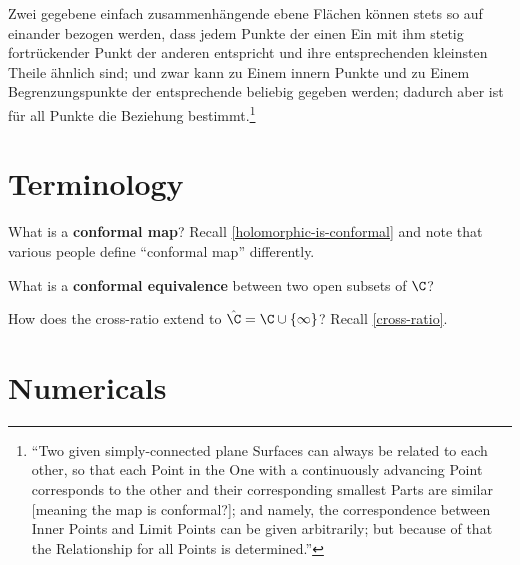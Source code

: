\documentclass{homework}
\author{Jim Fowler}
\begin{document}
\maketitle

\begin{inspiration}
  Zwei gegebene einfach zusammenh\"angende ebene Fl\"achen k\"onnen
  stets so auf einander bezogen werden, dass jedem Punkte der einen
  Ein mit ihm stetig fortr\"uckender Punkt der anderen entspricht und
  ihre entsprechenden kleinsten Theile \"ahnlich sind; und zwar kann
  zu Einem innern Punkte und zu Einem Begrenzungspunkte der
  entsprechende beliebig gegeben werden; dadurch aber ist f\"ur all
  Punkte die Beziehung bestimmt.\footnote{``Two given simply-connected
    plane Surfaces can always be related to each other, so that each
    Point in the One with a continuously advancing Point corresponds
    to the other and their corresponding smallest Parts are similar
    [meaning the map is conformal?]; and namely, the correspondence
    between Inner Points and Limit Points can be given arbitrarily;
    but because of that the Relationship for all Points is
    determined.''}  
\end{inspiration}

\section{Terminology}

\begin{problem}
  What is a \textbf{conformal map}?  Recall
  \ref{holomorphic-is-conformal} and note that various people define
  ``conformal map'' differently.
\end{problem}

\begin{problem}
  What is a \textbf{conformal equivalence} between two open subsets of $\C$?
\end{problem}

\begin{problem}
  How does the cross-ratio extend to $\hat{\C} = \C \cup \{\infty\}$?
  Recall \ref{cross-ratio}.
\end{problem}

\section{Numericals}
\end{document}
